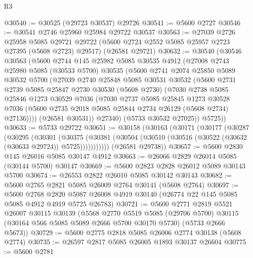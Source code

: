 \begin{lexlean}{R3}
\begin{coremodule}
@30540 := @30525 (@29723 @30537) @29726
@30541 := @5600 @2727
@30546 := @30541 @2746 @25960 @25984 @29722 @30537
@30563 := @27039
    @2726
    @25958
    @5085
    @29721
    @29722
    (@5600 @2724 @2552 @5085 @25957 @2723 @27395 (@5608 @2723) @29517)
    (@26581 @29721)
@30632 := @30540
    (@30546
      @30563
      (@5600
        @2744
        @145
        @25982
        @5085
        @30535
        @4912
        (@27008
          @2743
          @25980
          @5085
          (@30533 @5700)
          @30535
          (@5600
            @2741
            @2074
            @25850
            @5089
            @30532
            @5700
            (@27039
              @2740
              @25848
              @5085
              @30531
              @30532
              (@5600
                @2731
                @2739
                @5085
                @25847
                @2730
                @30530
                (@5608 @2730)
                (@7030
                  @2738
                  @5085
                  @25846
                  @1273
                  @30529
                  @7036
                  (@7030
                    @2737
                    @5085
                    @25845
                    @1273
                    @30528
                    @7036
                    (@5600 @2735 @2018 @5085 @25844 @2734 @26129 (@5608 @2734) @27136))))
              (@26581 @30531))
            @27340)
          (@5733 @30532 @27025))
        @5725))
@30633 := @5733 @29722
@30651 := @30158
    (@30163
      (@30171
        (@30177
          (@30287
            (@30295
              (@30301
                (@30375
                  (@30381 (@30504 (@30510 (@30516 (@30522 (@30632 (@30633 @29724)) @5725)))))))))))
      (@26581 @29738))
@30657 := @5600 @2830 @145 @26016 @5085 @30147 @4912
@30663 := @26066 @2829 @26014 @5085 (@30144 @5700) @30147
@30669 := @5600 @2823 @2828 @26012 @5089 @30143 @5700
@30674 := @26553 @2822 @26010 @5085 @30142 @30143
@30682 := @5600 @2765 @2821 @5085 @26009 @2764 @30141 (@5608 @2764)
@30697 := @5600
    @2768
    @2820
    @5087
    @26008
    @4919
    @30140
    (@26774 @22 @145 @5085 @5085 @4912 @4919 @5725 @26783)
@30721 := @5600
    @2771
    @2819
    @5521
    @26007
    @30115
    @30139
    (@5568
      @2770
      @5519
      @5085
      (@29706 @5700)
      @30115
      (@30164 @566 @5085 @5089 @2666 @5700 @30170 @5730)
      (@5733 @2666 @5673))
@30729 := @5600 @2775 @2818 @5085 @26006 @2774 @30138 (@5608 @2774)
@30735 := @26597 @2817 @5085 @26005 @1893 @30137 @26604
@30775 := @5600
    @2781

\end{coremodule}
\end{lexlean}

